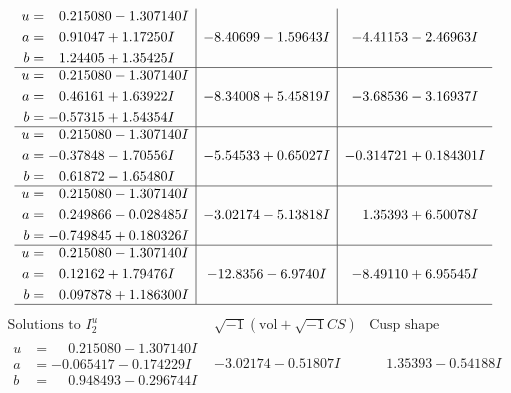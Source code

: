 \documentclass[1p]{elsarticle_modified}
\theoremstyle{definition}
\newcommand{\I}{\sqrt{-1}}
\begin{document}
$$\begin{array}{c|c|c}
\begin{aligned}
u &= \phantom{-}0.215080 - 1.307140 I \\
a &= \phantom{-}0.91047 + 1.17250 I \\
b &= \phantom{-}1.24405 + 1.35425 I\end{aligned}
 & -8.40699 - 1.59643 I & -4.41153 - 2.46963 I \\ \hline\begin{aligned}
u &= \phantom{-}0.215080 - 1.307140 I \\
a &= \phantom{-}0.46161 + 1.63922 I \\
b &= -0.57315 + 1.54354 I\end{aligned}
 & -8.34008 + 5.45819 I & -3.68536 - 3.16937 I \\ \hline\begin{aligned}
u &= \phantom{-}0.215080 - 1.307140 I \\
a &= -0.37848 - 1.70556 I \\
b &= \phantom{-}0.61872 - 1.65480 I\end{aligned}
 & -5.54533 + 0.65027 I & -0.314721 + 0.184301 I \\ \hline\begin{aligned}
u &= \phantom{-}0.215080 - 1.307140 I \\
a &= \phantom{-}0.249866 - 0.028485 I \\
b &= -0.749845 + 0.180326 I\end{aligned}
 & -3.02174 - 5.13818 I & \phantom{-}1.35393 + 6.50078 I \\ \hline\begin{aligned}
u &= \phantom{-}0.215080 - 1.307140 I \\
a &= \phantom{-}0.12162 + 1.79476 I \\
b &= \phantom{-}0.097878 + 1.186300 I\end{aligned}
 & -12.8356 - 6.9740 I & -8.49110 + 6.95545 I\\
 \hline 
 \end{array}$$\newpage$$\begin{array}{c|c|c}  
\text{Solutions to }I^u_{2}& \I (\text{vol} + \sqrt{-1}CS) & \text{Cusp shape}\\
 \hline 
\begin{aligned}
u &= \phantom{-}0.215080 - 1.307140 I \\
a &= -0.065417 - 0.174229 I \\
b &= \phantom{-}0.948493 - 0.296744 I\end{aligned}
 & -3.02174 - 0.51807 I & \phantom{-}1.35393 - 0.54188 I \\ \hline\begin{aligned}

\end{aligned}
\end{array}$$
\end{document}
